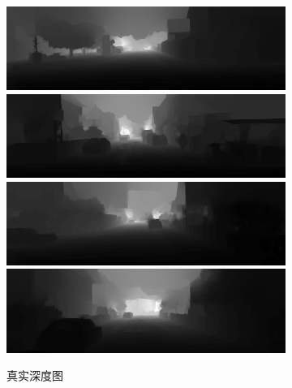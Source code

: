 \begin{figure}[htb]
\begin{subfigure}{0.24\linewidth}
  \end{subfigure}
  \begin{subfigure}{0.24\linewidth}
  \begin{minipage}[b]{1\linewidth}
  \includegraphics[width=1\linewidth]{figure/Pixel_cla_kitti/1gt.png}\vspace{4pt}
  \includegraphics[width=1\linewidth]{figure/Pixel_cla_kitti/2gt.png}\vspace{4pt}
  \includegraphics[width=1\linewidth]{figure/Pixel_cla_kitti/3gt.png}\vspace{4pt}
  \includegraphics[width=1\linewidth]{figure/Pixel_cla_kitti/4gt.png}
  \end{minipage}
  \caption{真实深度图}
  \end{subfigure}
  \begin{subfigure}{0.24\linewidth}
  \begin{minipage}[b]{1\linewidth}

\end{minipage}
\end{subfigure}
\end{figure}
